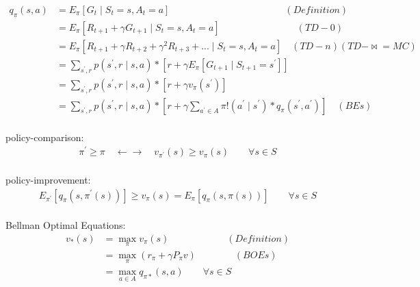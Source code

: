 \documentclass{article}
\begin{document}
\begin{align*}
    q_{\pi}(s, a) 
      &= E_{\pi} \left[ G_{t} \mid S_{t}=s, A_{t}=a \right] 
      \qquad \qquad \qquad \qquad \qquad \qquad (Definition) \\[3pt]
      &= E_{\pi} \left[ R_{t+1} + \gamma G_{t+1} 
         \mid S_{t}=s, A_{t}=a \right] 
         \qquad \qquad \qquad \qquad (TD-0) \\[3pt]
      &= E_{\pi} \left[ R_{t+1} + \gamma R_{t+2} + \gamma^2 R_{t+3} + ... 
         \mid S_{t}=s, A_{t}=a \right] 
         \quad (TD-n)(TD-\Join =MC) \\[3pt]
      &= \sum_{s^{\prime}, r} 
         p \left( s^{\prime}, r \mid s, a \right) * 
         \left[ r + \gamma E_{\pi} 
         \left[ G_{t+1} \mid S_{t+1}=s^{\prime} \right] \right] \\[3pt]
      &= \sum_{s^{\prime}, r} 
         p \left( s^{\prime}, r \mid s, a \right) * 
         \left[ r + \gamma 
         v_{\pi} \left( s^{\prime} \right) \right] \\[3pt]
      &= \sum_{s^{\prime}, r} 
         p \left( s^{\prime}, r \mid s, a \right) * 
         \left[ r + \gamma 
         \sum_{a^{\prime} \in A} 
         \pi ! \left( a^{\prime} \mid s^{\prime} \right) * 
         q_{\pi} \left( s^{\prime}, a^{\prime} \right) \right] 
         \quad (BEs) \\[3pt]
\end{align*}


\newpage


policy-comparison: 
\begin{align*}
    \pi^{\prime} \geq \pi 
    \quad \leftarrow \rightarrow \quad 
    v_{\pi^{\prime}}(s) \geq v_{\pi}(s) 
    \qquad \forall s \in S 
\end{align*}
\\[3pt]


policy-improvement: 
\begin{align*}
    E_{\pi^{\prime}} 
    \left[ q_{\pi} \left( s, \pi^{\prime}(s) \right) \right] 
    \geq v_{\pi}(s) 
    = E_{\pi} \left[ q_{\pi} \left( s, \pi(s) \right) \right] 
    \qquad \forall s \in S 
\end{align*}
\\[3pt]


Bellman Optimal Equations: 
\begin{align*}
    v_{*}(s) 
    & = \max_{\pi} v_{\pi}(s) 
        \qquad \qquad \qquad (Definition) \\[3pt]
    & = \max_{\pi} \left( r_{\pi} + \gamma P_{\pi} v \right) 
        \qquad \qquad (BOEs) \\[3pt]
    & = \max_{a \in A} q_{\pi *}(s, a) 
        \qquad \forall s \in S \\[3pt]
\end{align*}
\\[3pt]
\end{document}
